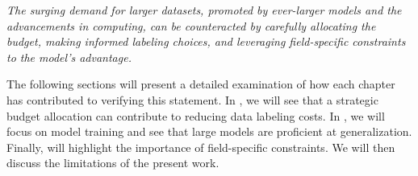 \textit{The surging demand for larger datasets, promoted by ever-larger models and the advancements in computing, can be counteracted by carefully allocating the budget, making informed labeling choices, and leveraging field-specific constraints to the model's advantage.}

The following sections will present a detailed examination of how each chapter has contributed to verifying this statement. In , we will see that a strategic budget allocation can contribute to reducing data labeling costs. In , we will focus on model training and see that large models are proficient at generalization. Finally,  will highlight the importance of field-specific constraints. We will then discuss the limitations of the present work. 


